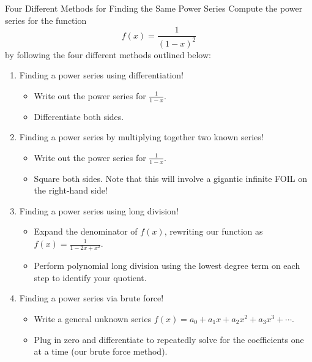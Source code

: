 \begin{exercise}{Four Different Methods for Finding the Same Power Series \Coffeecup \Coffeecup }
Compute the power series for the function $$f(x)=\frac{1}{(1-x)^2} $$
by following the four different methods outlined below:
\begin{enumerate}
\item Finding a power series using differentiation! \begin{itemize}
\item Write out the power series for $\frac{1}{1-x}$.
\item Differentiate both sides.
\vspace*{3in}
\end{itemize}

\item Finding a power series by multiplying together two known series! \begin{itemize}
\item Write out the power series for $\frac{1}{1-x}$.
\item Square both sides.  Note that this will involve a gigantic infinite FOIL on the right-hand side!
\vspace*{3in}
\end{itemize}

\item Finding a power series using long division! \begin{itemize}
\item Expand the denominator of $f(x)$, rewriting our function as $f(x)=\frac{1}{1-2x+x^2}$. 
\item Perform polynomial long division using the lowest degree term on each step to identify your quotient.
\vspace*{3in}
\end{itemize}

\item Finding a power series via brute force! \begin{itemize}
\item Write a general unknown series $f(x)=a_0+a_1x+a_2x^2+a_3x^3+\cdots$. 
\item Plug in zero and differentiate to repeatedly solve for the coefficients one at a time (our brute force method).
\vspace*{3in}
\end{itemize}
\end{enumerate}

\end{exercise}